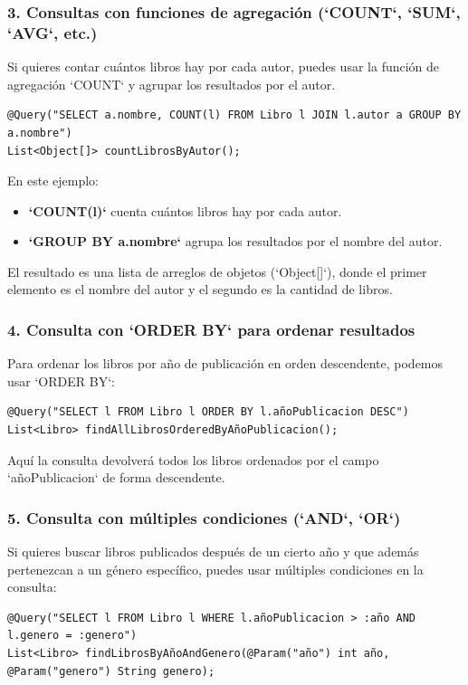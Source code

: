 \documentclass[11pt]{article}
\begin{document}
\subsubsection{3. Consultas con funciones de agregación (`COUNT`, `SUM`, `AVG`, etc.)}
\label{sec:org5d266d1}
Si quieres contar cuántos libros hay por cada autor, puedes usar la función de agregación `COUNT` y agrupar los resultados por el autor.

\begin{verbatim}
@Query("SELECT a.nombre, COUNT(l) FROM Libro l JOIN l.autor a GROUP BY a.nombre")
List<Object[]> countLibrosByAutor();
\end{verbatim}

En este ejemplo:
\begin{itemize}
\item \textbf{\textbf{`COUNT(l)`}} cuenta cuántos libros hay por cada autor.
\item \textbf{\textbf{`GROUP BY a.nombre`}} agrupa los resultados por el nombre del autor.
\end{itemize}

El resultado es una lista de arreglos de objetos (`Object[]`), donde el primer elemento es el nombre del autor y el segundo es la cantidad de libros.

\subsubsection{4. Consulta con `ORDER BY` para ordenar resultados}
\label{sec:org35304de}
Para ordenar los libros por año de publicación en orden descendente, podemos usar `ORDER BY`:

\begin{verbatim}
@Query("SELECT l FROM Libro l ORDER BY l.añoPublicacion DESC")
List<Libro> findAllLibrosOrderedByAñoPublicacion();
\end{verbatim}

Aquí la consulta devolverá todos los libros ordenados por el campo `añoPublicacion` de forma descendente.

\subsubsection{5. Consulta con múltiples condiciones (`AND`, `OR`)}
\label{sec:orgdf47aa4}
Si quieres buscar libros publicados después de un cierto año y que además pertenezcan a un género específico, puedes usar múltiples condiciones en la consulta:

\begin{verbatim}
@Query("SELECT l FROM Libro l WHERE l.añoPublicacion > :año AND l.genero = :genero")
List<Libro> findLibrosByAñoAndGenero(@Param("año") int año, @Param("genero") String genero);
\end{verbatim}
\end{document}
